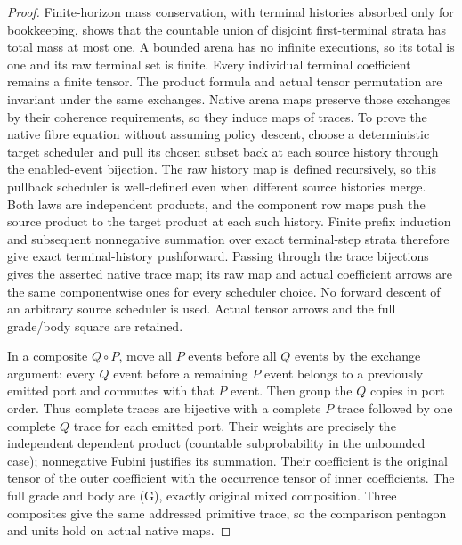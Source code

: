 \documentclass[11pt]{article}
\begin{document}
\begin{proof}
Finite-horizon mass conservation, with terminal histories absorbed only for bookkeeping, shows that the countable union of disjoint first-terminal strata has total mass at most one. A bounded arena has no infinite executions, so its total is one and its raw terminal set is finite. Every individual terminal coefficient remains a finite tensor. The product formula and actual tensor permutation are invariant under the same exchanges. Native arena maps preserve those exchanges by their coherence requirements, so they induce maps of traces. To prove the native fibre equation without assuming policy descent, choose a deterministic target scheduler and pull its chosen subset back at each source history through the enabled-event bijection. The raw history map is defined recursively, so this pullback scheduler is well-defined even when different source histories merge. Both laws are independent products, and the component row maps push the source product to the target product at each such history. Finite prefix induction and subsequent nonnegative summation over exact terminal-step strata therefore give exact terminal-history pushforward. Passing through the trace bijections gives the asserted native trace map; its raw map and actual coefficient arrows are the same componentwise ones for every scheduler choice. No forward descent of an arbitrary source scheduler is used. Actual tensor arrows and the full grade/body square are retained.

In a composite $Q\circ P$, move all $P$ events before all $Q$ events by the exchange argument: every $Q$ event before a remaining $P$ event belongs to a previously emitted port and commutes with that $P$ event. Then group the $Q$ copies in port order. Thus complete traces are bijective with a complete $P$ trace followed by one complete $Q$ trace for each emitted port. Their weights are precisely the independent dependent product (countable subprobability in the unbounded case); nonnegative Fubini justifies its summation. Their coefficient is the original tensor of the outer coefficient with the occurrence tensor of inner coefficients. The full grade and body are (G), exactly original mixed composition. Three composites give the same addressed primitive trace, so the comparison pentagon and units hold on actual native maps.\end{proof}
\end{document}
